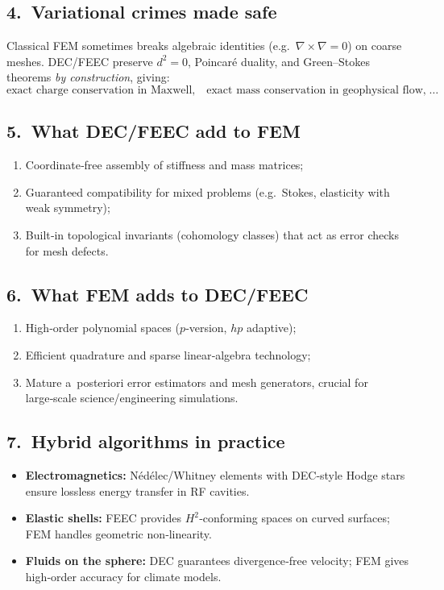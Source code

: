 \documentclass[12pt]{article}
\theoremstyle{definition} %
\theoremstyle{plain} %
\begin{document}
\subsection*{4.\  Variational crimes made safe}
Classical FEM sometimes breaks algebraic identities
(e.g.\ $\nabla\!\times\nabla = 0$) on coarse meshes.  
DEC/FEEC preserve $d^2=0$, Poincaré duality, and Green–Stokes theorems
\emph{by construction}, giving:
\[
  \text{exact charge conservation in Maxwell,}\quad
  \text{exact mass conservation in geophysical flow,}\;\ldots
\]

\subsection*{5.\  What DEC/FEEC add to FEM}
\begin{enumerate}
  \item Coordinate‑free assembly of stiffness and mass matrices;
  \item Guaranteed compatibility for mixed problems
        (e.g.\ Stokes, elasticity with weak symmetry);
  \item Built‑in topological invariants (cohomology classes) that act
        as error checks for mesh defects.
\end{enumerate}

\subsection*{6.\  What FEM adds to DEC/FEEC}
\begin{enumerate}
  \item High‑order polynomial spaces ($p$‑version, $hp$ adaptive);
  \item Efficient quadrature and sparse linear‑algebra technology;
  \item Mature a~posteriori error estimators and mesh generators,
        crucial for large‑scale science/engineering simulations.
\end{enumerate}

\subsection*{7.\  Hybrid algorithms in practice}
\begin{itemize}
  \item \textbf{Electromagnetics:}\; Nédélec/Whitney elements with
        DEC‑style Hodge stars ensure lossless energy transfer in RF
        cavities.
  \item \textbf{Elastic shells:}\; FEEC provides $H^2$‑conforming
        spaces on curved surfaces; FEM handles geometric non‑linearity.
  \item \textbf{Fluids on the sphere:}\; DEC guarantees
        divergence‑free velocity; FEM gives high‑order accuracy for
        climate models.
\end{itemize}
\end{document}
